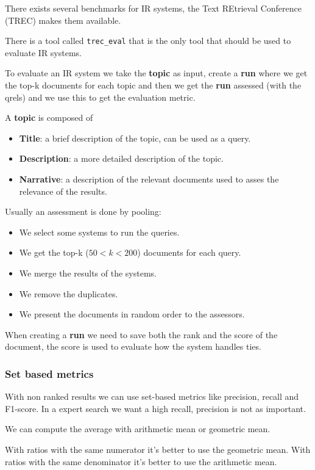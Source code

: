 There exists several benchmarks for IR systems, the Text REtrieval Conference (TREC)
makes them available.

There is a tool called \texttt{trec\_eval} that is the only tool that should be used
to evaluate IR systems.

To evaluate an IR system we take the \textbf{topic} as input, create a \textbf{run}
where we get the top-k documents for each topic and then we get the \textbf{run}
assessed (with the qrels) and we use this to get the evaluation metric.

A \textbf{topic} is composed of
\begin{itemize}
    \item \textbf{Title}: a brief description of the topic, can be used as a query.
    \item \textbf{Description}: a more detailed description of the topic.
    \item \textbf{Narrative}: a description of the relevant documents used to asses the
    relevance of the results.
\end{itemize}

Usually an assessment is done by pooling:
\begin{itemize}
    \item We select some systems to run the queries.
    \item We get the top-k ($50<k<200$) documents for each query.
    \item We merge the results of the systems.
    \item We remove the duplicates.
    \item We present the documents in random order to the assessors.
\end{itemize}

When creating a \textbf{run} we need to save both the rank and the score of the document,
the score is used to evaluate how the system handles ties.

\subsubsection{Set based metrics}
\label{sec:set_based_metrics}

With non ranked results we can use set-based metrics like precision, 
recall and F1-score.
In a expert search we want a high recall, precision is not as important.

We can compute the average with arithmetic mean or geometric mean.

With ratios with the same numerator it's better to use the geometric mean.
With ratios with the same denominator it's better to use the arithmetic mean.

